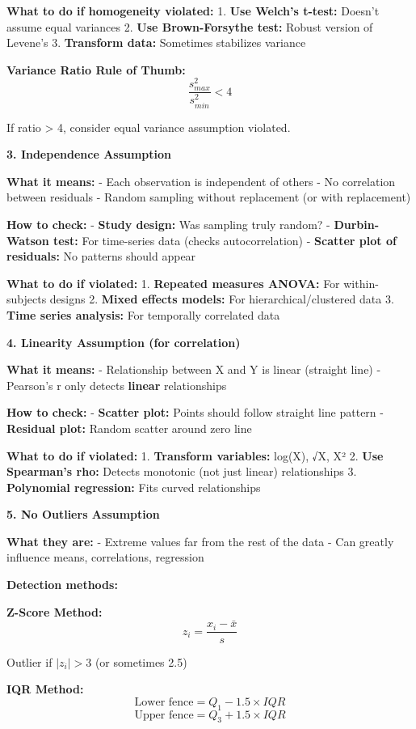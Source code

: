 \documentclass[11pt]{article}
\begin{document}
\textbf{What to do if homogeneity violated:} 1. \textbf{Use Welch's
t-test:} Doesn't assume equal variances 2. \textbf{Use Brown-Forsythe
test:} Robust version of Levene's 3. \textbf{Transform data:} Sometimes
stabilizes variance

\textbf{Variance Ratio Rule of Thumb:}
\[\frac{s_{max}^2}{s_{min}^2} < 4\]

If ratio \textgreater{} 4, consider equal variance assumption violated.

\textbf{3. Independence Assumption}

\textbf{What it means:} - Each observation is independent of others - No
correlation between residuals - Random sampling without replacement (or
with replacement)

\textbf{How to check:} - \textbf{Study design:} Was sampling truly
random? - \textbf{Durbin-Watson test:} For time-series data (checks
autocorrelation) - \textbf{Scatter plot of residuals:} No patterns
should appear

\textbf{What to do if violated:} 1. \textbf{Repeated measures ANOVA:}
For within-subjects designs 2. \textbf{Mixed effects models:} For
hierarchical/clustered data 3. \textbf{Time series analysis:} For
temporally correlated data

\textbf{4. Linearity Assumption (for correlation)}

\textbf{What it means:} - Relationship between X and Y is linear
(straight line) - Pearson's r only detects \textbf{linear} relationships

\textbf{How to check:} - \textbf{Scatter plot:} Points should follow
straight line pattern - \textbf{Residual plot:} Random scatter around
zero line

\textbf{What to do if violated:} 1. \textbf{Transform variables:}
log(X), √X, X² 2. \textbf{Use Spearman's rho:} Detects monotonic (not
just linear) relationships 3. \textbf{Polynomial regression:} Fits
curved relationships

\textbf{5. No Outliers Assumption}

\textbf{What they are:} - Extreme values far from the rest of the data -
Can greatly influence means, correlations, regression

\textbf{Detection methods:}

\textbf{Z-Score Method:} \[z_i = \frac{x_i - \bar{x}}{s}\]

Outlier if \(|z_i| > 3\) (or sometimes 2.5)

\textbf{IQR Method:} \[\text{Lower fence} = Q_1 - 1.5 \times IQR\]
\[\text{Upper fence} = Q_3 + 1.5 \times IQR\]
\end{document}
